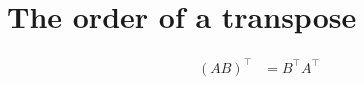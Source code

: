 \documentclass{article}
\begin{document}
\section{The order of a transpose}
\begin{align*}
(A B)^\top &= B^\top A^\top
\end{align*}
\end{document}
